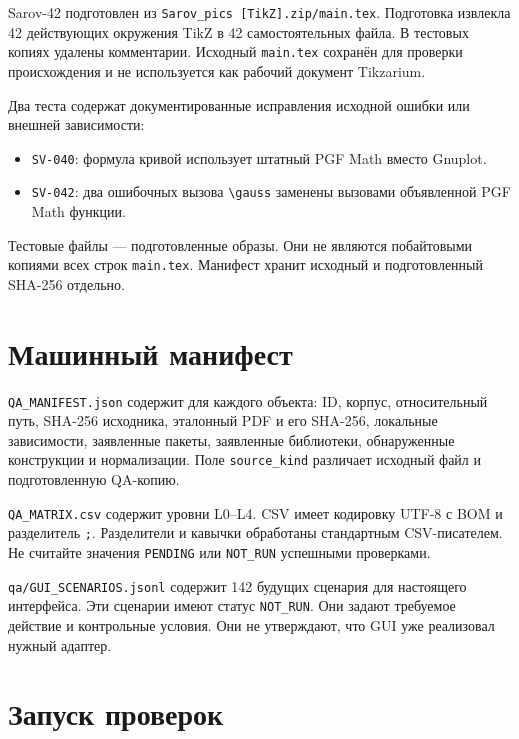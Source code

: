 \documentclass[11pt,a4paper,oneside]{scrreprt}
\providecommand{\tightlist}{\setlength{\itemsep}{0pt}\setlength{\parskip}{0pt}}
\begin{document}
Sarov-42 подготовлен из \texttt{Sarov\_pics\ {[}TikZ{]}.zip/main.tex}. Подготовка извлекла 42 действующих окружения TikZ в 42 самостоятельных файла. В тестовых копиях удалены комментарии. Исходный \texttt{main.tex} сохранён для проверки происхождения и не используется как рабочий документ Tikzarium.

Два теста содержат документированные исправления исходной ошибки или внешней зависимости:

\begin{itemize}
\tightlist
\item
  \texttt{SV-040}: формула кривой использует штатный PGF Math вместо Gnuplot.
\item
  \texttt{SV-042}: два ошибочных вызова \texttt{\textbackslash{}gauss} заменены вызовами объявленной PGF Math функции.
\end{itemize}

Тестовые файлы --- подготовленные образы. Они не являются побайтовыми копиями всех строк \texttt{main.tex}. Манифест хранит исходный и подготовленный SHA-256 отдельно.

\section{Машинный манифест}\label{ux43cux430ux448ux438ux43dux43dux44bux439-ux43cux430ux43dux438ux444ux435ux441ux442}

\texttt{QA\_MANIFEST.json} содержит для каждого объекта: ID, корпус, относительный путь, SHA-256 исходника, эталонный PDF и его SHA-256, локальные зависимости, заявленные пакеты, заявленные библиотеки, обнаруженные конструкции и нормализации. Поле \texttt{source\_kind} различает исходный файл и подготовленную QA-копию.

\texttt{QA\_MATRIX.csv} содержит уровни L0--L4. CSV имеет кодировку UTF-8 с BOM и разделитель \texttt{;}. Разделители и кавычки обработаны стандартным CSV-писателем. Не считайте значения \texttt{PENDING} или \texttt{NOT\_RUN} успешными проверками.

\texttt{qa/GUI\_SCENARIOS.jsonl} содержит 142 будущих сценария для настоящего интерфейса. Эти сценарии имеют статус \texttt{NOT\_RUN}. Они задают требуемое действие и контрольные условия. Они не утверждают, что GUI уже реализовал нужный адаптер.

\section{Запуск проверок}\label{ux437ux430ux43fux443ux441ux43a-ux43fux440ux43eux432ux435ux440ux43eux43a}
\end{document}

